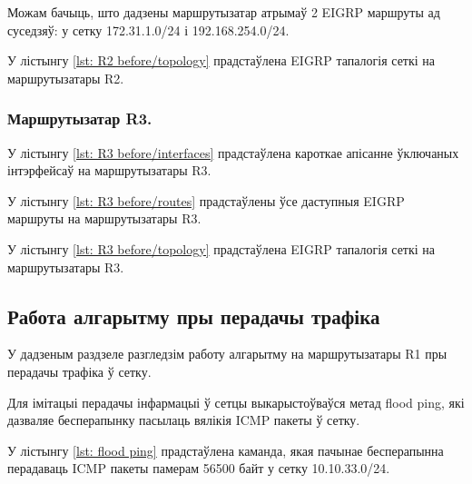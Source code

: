 Можам бачыць, што дадзены маршрутызатар атрымаў 2 EIGRP маршруты ад суседзяў: у сетку 172.31.1.0/24 і 192.168.254.0/24.

У лістынгу \ref{lst: R2 before/topology} прадстаўлена EIGRP тапалогія сеткі на маршрутызатары R2.



\subsubsection{Маршрутызатар R3.}

У лістынгу \ref{lst: R3 before/interfaces} прадстаўлена кароткае апісанне ўключаных інтэрфейсаў на маршрутызатары R3.



У лістынгу \ref{lst: R3 before/routes} прадстаўлены ўсе даступныя EIGRP маршруты на маршрутызатары R3.



У лістынгу \ref{lst: R3 before/topology} прадстаўлена EIGRP тапалогія сеткі на маршрутызатары R3.



\subsection{Работа алгарытму пры перадачы трафіка}

У дадзеным раздзеле разгледзім работу алгарытму на маршрутызатары R1 пры
перадачы трафіка ў сетку.

Для імітацыі перадачы інфармацыі ў сетцы выкарыстоўваўся метад flood ping,
які дазваляе бесперапынку пасылаць вялікія ICMP пакеты ў сетку.

У лістынгу \ref{lst: flood ping} прадстаўлена каманда, якая пачынае 
бесперапынна перадаваць ICMP пакеты памерам 56500 байт у сетку 10.10.33.0/24.

